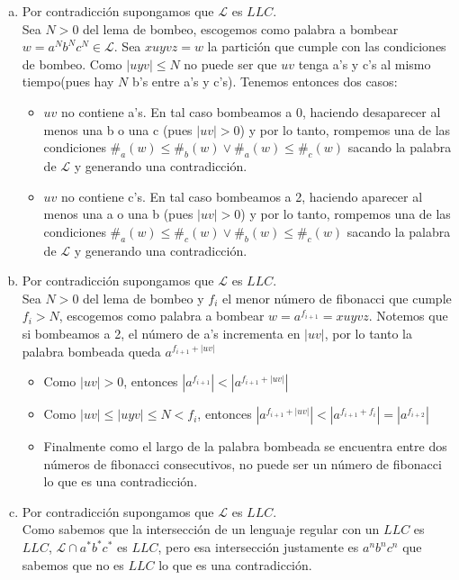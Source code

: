 \documentclass[dcc]{fcfmcourse}
\begin{document}
\begin{center}
\begin{problems}
\begin{enumerate}[a)]
\begin{center}
\end{center}
\end{enumerate}
\newpage
\problem
\begin{enumerate}[a)]
    \item Por contradicción supongamos que $\mathcal{L}$ es $LLC$.\\
    Sea $N>0$ del lema de bombeo, escogemos como palabra a bombear $w = a^Nb^Nc^N \in \mathcal{L}$. Sea $xuyvz = w$ la partición que cumple con las condiciones de bombeo. Como $|uyv|\le N$ no puede ser que $uv$ tenga a's y c's al mismo tiempo(pues hay $N$ b's entre a's y c's). Tenemos entonces dos casos:
    \begin{itemize}
        \item $uv$ no contiene a's. En tal caso bombeamos a 0, haciendo desaparecer al menos una b o una c (pues $|uv|>0$) y por lo tanto, rompemos una de las condiciones $\#_{a}(w) \le \#_{b}(w) \lor \#_{a}(w) \le \#_{c}(w)$ sacando la palabra de $\mathcal{L}$ y generando una contradicción.
        \item $uv$ no contiene c's. En tal caso bombeamos a 2, haciendo aparecer al menos una a o una b (pues $|uv|>0$) y por lo tanto, rompemos una de las condiciones $\#_{a}(w) \le \#_{c}(w) \lor \#_{b}(w) \le \#_{c}(w)$ sacando la palabra de $\mathcal{L}$ y generando una contradicción.
    \end{itemize}
    \item Por contradicción supongamos que $\mathcal{L}$ es $LLC$.\\
    Sea $N>0$ del lema de bombeo y $f_{i}$ el menor número de fibonacci que cumple $f_{i}>N$, escogemos como palabra a bombear $w = a^{f_{i+1}}= xuyvz$. Notemos que si bombeamos a 2, el número de a's incrementa en $|uv|$, por lo tanto la palabra bombeada queda $a^{f_{i+1}+|uv|}$
    \begin{itemize}
        \item Como $|uv|>0$, entonces $|a^{f_{i+1}}|<|a^{f_{i+1}+|uv|}|$
        \item Como $|uv|\le |uyv|\le N < f_{i}$, entonces $|a^{f_{i+1}+|uv|}| < |a^{f_{i+1}+f_{i}}| = |a^{f_{i+2}}|$
        \item Finalmente como el largo de la palabra bombeada se encuentra entre dos números de fibonacci consecutivos, no puede ser un número de fibonacci lo que es una contradicción.
    \end{itemize}
    \item Por contradicción supongamos que $\mathcal{L}$ es $LLC$.\\ Como sabemos que la intersección de un lenguaje regular con un $LLC$ es $LLC$, $\mathcal{L}\cap a^*b^*c^*$ es $LLC$, pero esa intersección justamente es $a^nb^nc^n$ que sabemos que no es $LLC$ lo que es una contradicción.
\end{enumerate}
\end{problems}
\end{center}
\end{document}
